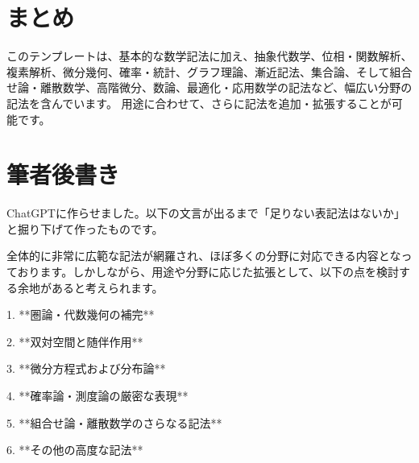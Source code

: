 \documentclass{ltjsarticle} %
\begin{document}
\section{まとめ}
このテンプレートは、基本的な数学記法に加え、抽象代数学、位相・関数解析、複素解析、微分幾何、確率・統計、グラフ理論、漸近記法、集合論、そして組合せ論・離散数学、高階微分、数論、最適化・応用数学の記法など、幅広い分野の記法を含んでいます。  
用途に合わせて、さらに記法を追加・拡張することが可能です。

\section{筆者後書き}
ChatGPTに作らせました。以下の文言が出るまで「足りない表記法はないか」と掘り下げて作ったものです。

全体的に非常に広範な記法が網羅され、ほぼ多くの分野に対応できる内容となっております。しかしながら、用途や分野に応じた拡張として、以下の点を検討する余地があると考えられます。

1. **圏論・代数幾何の補完**  

2. **双対空間と随伴作用**  

3. **微分方程式および分布論**  

4. **確率論・測度論の厳密な表現**  

5. **組合せ論・離散数学のさらなる記法**  

6. **その他の高度な記法**  
\end{document}
